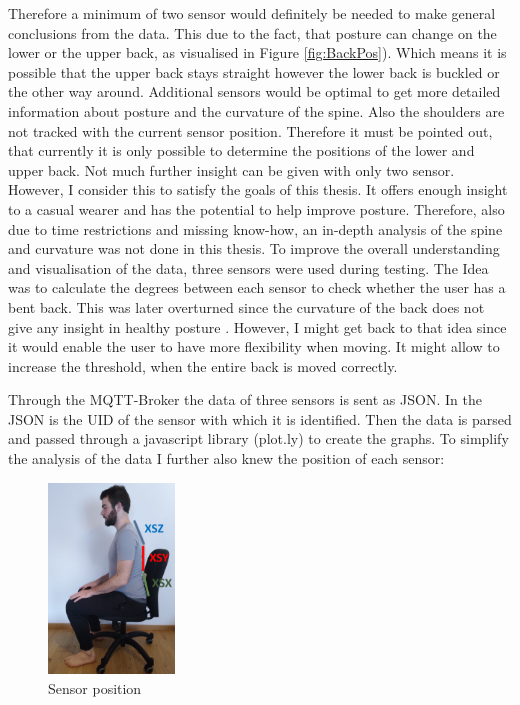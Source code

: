Therefore a minimum of two sensor would definitely be needed to make general conclusions from the data. This due to the fact, that posture can change on the lower or the upper back, as visualised in Figure \ref{fig:BackPos}). Which means it is possible that the upper back stays straight however the lower back is buckled or the other way around. Additional sensors would be optimal to get more detailed information about posture and the curvature of the spine. Also the shoulders are not tracked with the current sensor position. Therefore it must be pointed out, that currently it is only possible to determine the positions of the lower and upper back. Not much further insight can be given with only two sensor. However, I consider this to satisfy the goals of this thesis. It offers enough insight to a casual wearer and has the potential to help improve posture. Therefore, also due to time restrictions and missing know-how, an in-depth analysis of the spine and curvature was not done in this thesis. To improve the overall understanding and visualisation of the data, three sensors were used during testing. The Idea was to calculate the degrees between each sensor to check whether the user has a bent back. This was later overturned since the curvature of the back does not give any insight in healthy posture \cite{SitUpSt77:online}. However, I might get back to that idea since it would enable the user to have more flexibility when moving. It might allow to increase the threshold, when the entire back is moved correctly.

Through the MQTT-Broker the data of three sensors is sent as JSON. In the JSON is the UID of the sensor with which it is identified. Then the data is parsed and passed through a javascript library (plot.ly) \cite{ModernAn18:online} to create the graphs. To simplify the analysis of the data I further also knew the position of each sensor:

\begin{figure}[ht]
  \begin{center}
\includegraphics[width=0.3\textwidth]{images/ChairVisualised.png}
  \end{center}
  \caption{Sensor position}
  \label{fig:SensorPos}
\end{figure}

